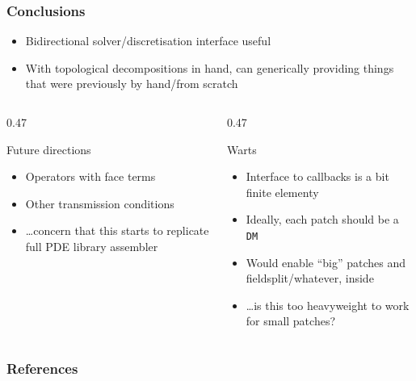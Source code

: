\documentclass[presentation,aspectratio=43,10pt]{beamer}
\begin{document}
\begin{frame}
  \frametitle{Conclusions}
  \begin{itemize}
  \item Bidirectional solver/discretisation interface useful
  \item With topological decompositions in hand, can generically
    providing things that were previously by hand/from scratch
  \end{itemize}

  \begin{columns}[T]
    \begin{column}{0.47\pagewidth}
      \begin{block}{Future directions}
        \begin{itemize}
        \item Operators with face terms
        \item Other transmission conditions
        \item \dots concern that this starts to replicate full PDE
          library assembler
        \end{itemize}
      \end{block}
    \end{column}
    \pause
    \begin{column}{0.47\pagewidth}
      \begin{block}{Warts}
        \begin{itemize}
        \item Interface to callbacks is a bit finite elementy
        \item Ideally, each patch should be a \texttt{DM}
        \item Would enable ``big'' patches and fieldsplit/whatever,
          inside
        \item \dots is this too heavyweight to work for small patches?
        \end{itemize}
      \end{block}
    \end{column}
  \end{columns}
\end{frame}

\appendix
\begin{frame}
  \frametitle{References}
  \printbibliography[heading=none]
\end{frame}
\end{document}
